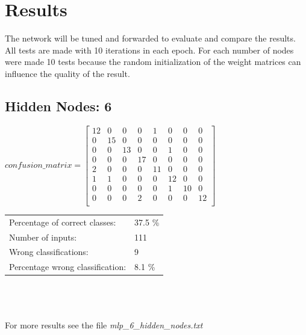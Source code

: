 \documentclass[10pt,a4paper]{article}
\begin{document}
 	\section{Results}						%
 	The network will be tuned and forwarded to evaluate and compare the results. All tests are made with 10 iterations in each epoch. For each number of nodes were made 10 tests because the random initialization of the weight matrices can influence the quality of the result.
 	\subsection{Hidden Nodes: 6}
 	\begin{center}
 		$ confusion\_matrix = \begin{bmatrix}
 		12& 0& 0& 0& 1& 0& 0& 0  \\
 		0& 15& 0& 0& 0& 0& 0& 0 \\
 		0& 0& 13& 0& 0& 1& 0& 0 \\
 		0& 0& 0& 17& 0& 0& 0& 0 \\
 		2& 0& 0& 0& 11& 0& 0& 0 \\
 		1& 1& 0& 0& 0& 12& 0& 0 \\
 		0& 0& 0& 0& 0& 1& 10& 0 \\
 		0& 0& 0& 2& 0& 0& 0& 12 \\
 		\end{bmatrix}$
 	\end{center}
 	
 	\begin{tabular} {ll}
 		Percentage of correct classes: &  37.5 \% \\
 		Number of inputs: & 111 \\
 		Wrong classifications: & 9 \\
 		Percentage wrong classification: & 8.1 \% \\
 	\end{tabular}
 	\\ 
 	\\ \\
 	For more results see the file \textit{mlp\_6\_hidden\_nodes.txt}
 	
\end{document}
